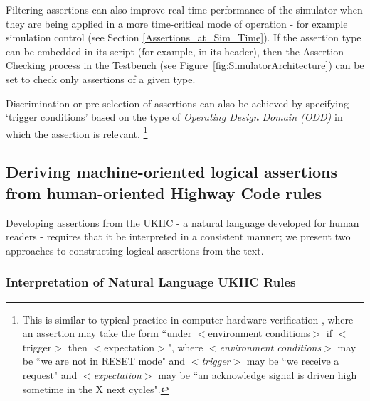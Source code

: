 Filtering assertions can also improve real-time performance of the simulator when they are being applied in a more time-critical mode of operation - for example  simulation control (see Section \ref{Assertions_at_Sim_Time}). If the assertion type can be embedded in its script (for example, in its header), then the Assertion Checking process in the Testbench (see Figure~\ref{fig:SimulatorArchitecture}) can be set to check only assertions of a given type.

Discrimination or pre-selection of assertions can also be achieved by specifying `trigger conditions' based on the type of \textit{Operating Design Domain (ODD)} in which the assertion is relevant.
\footnote{This is similar to typical practice in computer hardware verification \cite{tao2009}, where an assertion may take the form ``under $<$environment conditions$>$ if $<$trigger$>$ then $<$expectation$>$", where \textit{$<$environment conditions$>$} may be ``we are not in RESET mode" and \textit{$<$trigger$>$} may be ``we receive a request" and \textit{$<$expectation$>$}  may be ``an acknowledge signal is driven high sometime in the X next cycles".} 


\subsection{Deriving machine-oriented logical assertions from human-oriented Highway Code rules}
Developing assertions from the UKHC - a natural language developed for human readers - requires that it be interpreted in a consistent manner; we present two approaches to constructing logical assertions from the text. 

\subsubsection{Interpretation of Natural Language UKHC Rules} \label{interp_nat_lang_UKHC_rules}

